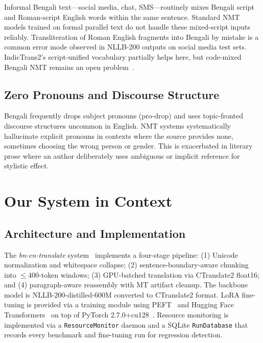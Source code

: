 \documentclass[conference]{IEEEtran}
\begin{document}
Informal Bengali text---social media, chat, SMS---routinely mixes Bengali
script and Roman-script English words within the same sentence.
Standard NMT models trained on formal parallel text do not handle
these mixed-script inputs reliably.
Transliteration of Roman English fragments into Bengali by mistake is a
common error mode observed in NLLB-200 outputs on social media test sets.
IndicTrans2's script-unified vocabulary partially helps here, but code-mixed
Bengali NMT remains an open problem~\cite{hasan2020low}.

\subsection{Zero Pronouns and Discourse Structure}

Bengali frequently drops subject pronouns (pro-drop) and uses
topic-fronted discourse structures uncommon in English.
NMT systems systematically hallucinate explicit pronouns in contexts
where the source provides none, sometimes choosing the wrong person or
gender.
This is exacerbated in literary prose where an author deliberately
uses ambiguous or implicit reference for stylistic effect.

\section{Our System in Context}
\label{sec:ours}

\subsection{Architecture and Implementation}

The \textit{bn-en-translate} system~\cite{biswas2025bnentr} implements a
four-stage pipeline: (1) Unicode normalization and whitespace collapse;
(2) sentence-boundary-aware chunking into $\le$400-token windows;
(3) GPU-batched translation via CTranslate2 float16; and
(4) paragraph-aware reassembly with MT artifact cleanup.
The backbone model is NLLB-200-distilled-600M converted to CTranslate2
format.
LoRA fine-tuning is provided via a training module using PEFT~\cite{mangrulkar2022peft}
and Hugging Face Transformers~\cite{wolf2020transformers} on top of
PyTorch 2.7.0+cu128~\cite{paszke2019pytorch}.
Resource monitoring is implemented via a \texttt{ResourceMonitor} daemon
and a SQLite \texttt{RunDatabase} that records every benchmark and
fine-tuning run for regression detection.
\end{document}
